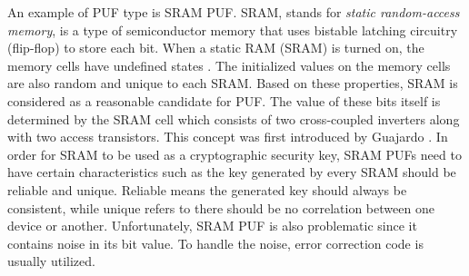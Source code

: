 An example of PUF type is SRAM PUF. SRAM, stands for \textit{static random-access memory}, is a type of semiconductor memory that uses bistable latching circuitry (flip-flop) to store each bit. When a static RAM (SRAM) is turned on, the memory cells have undefined states \cite{tuyls_2010}. The initialized values on the memory cells are also random and unique to each SRAM. Based on these properties, SRAM is considered as a reasonable candidate for PUF. The value of these bits itself is determined by the SRAM cell which consists of two cross-coupled inverters along with two access transistors. This concept was first introduced by Guajardo \cite{guajardo_kumar_schrijen_tuyls}. In order for SRAM to be used as a cryptographic security key, SRAM PUFs need to have certain characteristics such as the key generated by every SRAM should be reliable and unique. Reliable means the generated key should always be consistent, while unique refers to there should be no correlation between one device or another.
Unfortunately, SRAM PUF is also problematic since it contains noise in its bit value. To handle the noise, error correction code is usually utilized.




